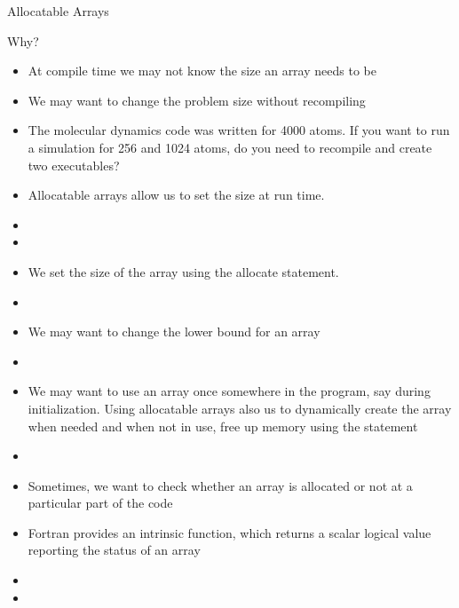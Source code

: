 \documentclass[10pt,t]{beamer}
\begin{document}
\begin{frame}{Allocatable Arrays}
  \begin{block}{\scriptsize Why?}
    \begin{itemize}
      \item At compile time we may not know the size an array needs to be
      \item We may want to change the problem size without recompiling
      \item The molecular dynamics code was written for 4000 atoms. If you want to run a simulation for 256 and 1024 atoms, do you need to recompile and create two executables?
    \end{itemize}
  \end{block}
  \begin{itemize}
    \item Allocatable arrays allow us to set the size at run time.
    \item[] 
    \item[] 
    \item We set the size of the array using the allocate statement.
    \item[] 
    \item We may want to change the lower bound for an array
    \item[] 
    \item We may want to use an array once somewhere in the program, say during initialization. Using allocatable arrays also us to dynamically create the array when needed and when not in use, free up memory using the  statement
    \item[] 
    \item Sometimes, we want to check whether an array is allocated or not at a particular part of the code
    \item Fortran provides an intrinsic function,  which returns a scalar logical value reporting the status of an array
    \item[] 
    \item[] 
  \end{itemize}
\end{frame}
\end{document}
